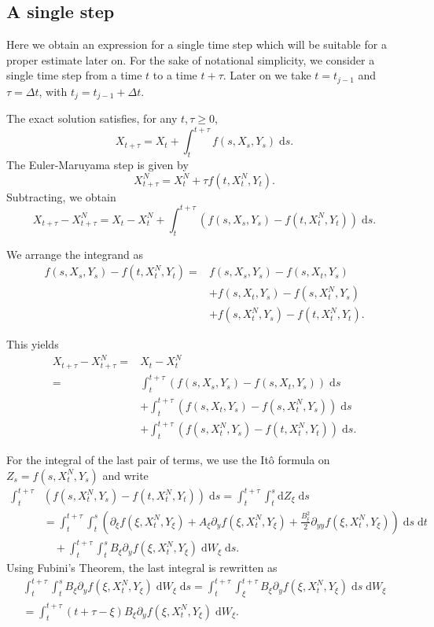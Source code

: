 \documentclass[reqno,12pt]{amsart}
\theoremstyle{plain}%
\theoremstyle{definition}
\begin{document}
\subsection{A single step}

Here we obtain an expression for a single time step which will be suitable for a proper estimate later on. For the sake of notational simplicity, we consider a single time step from a time $t$ to a time $t + \tau$. Later on we take $t=t_{j-1}$ and $\tau = \Delta t$, with $t_j = t_{j-1}+\Delta t$.

The exact solution satisfies, for any $t, \tau \geq 0$, 
$$
X_{t + \tau} = X_t + \int_t^{t + \tau} f(s, X_s, Y_s) \;\mathrm{d}s.
$$
The Euler-Maruyama step is given by
$$
X_{t+\tau}^N = X_t^N + \tau f(t, X_t^N, Y_t).
$$
Subtracting, we obtain
$$
X_{t + \tau} - X_{t + \tau}^N = X_t - X_t^N + \int_t^{t + \tau} \left( f(s, X_s, Y_s) - f(t, X_t^N, Y_t) \right)\;\mathrm{d}s.
$$

We arrange the integrand as
\begin{align*}
f(s, X_s, Y_s) - f(t, X_t^N, Y_t) = & f(s, X_s, Y_s) - f(s, X_t, Y_s) \\ 
 & + f(s, X_t, Y_s) - f(s, X_t^N, Y_s) \\
 & + f(s, X_t^N, Y_s) - f(t, X_t^N, Y_t).
\end{align*}

This yields
\begin{align*}
X_{t + \tau} - X_{t + \tau}^N  = & X_t - X_t^N \\
= &  \int_t^{t + \tau} \left( f(s, X_s, Y_s) - f(s, X_t, Y_s) \right)\;\mathrm{d}s \\ 
 & + \int_t^{t + \tau} \left( f(s, X_t, Y_s) - f(s, X_t^N, Y_s) \right)\;\mathrm{d}s \\
 & + \int_t^{t + \tau} \left( f(s, X_t^N, Y_s) - f(t, X_t^N, Y_t) \right)\;\mathrm{d}s.
\end{align*}

For the integral of the last pair of terms, we use the It\^o formula on $Z_s = f(s, X_t^N, Y_s)$ and write
\begin{align*}
\int_t^{t + \tau} & \left(f(s, X_t^N, Y_s) - f(t, X_t^N, Y_t) \right)\;\mathrm{d}s  = \int_t^{t + \tau} \int_t^s \mathrm{d}Z_\xi \;\mathrm{d}s \\
& = \int_t^{t + \tau} \int_t^s \left(\partial_\xi f(\xi, X_t^N, Y_\xi) + A_\xi \partial_y f(\xi, X_t^N, Y_\xi)  + \frac{B_\xi^2}{2}\partial_{yy}f(\xi, X_t^N, Y_\xi) \right) \;\mathrm{d}s\;\mathrm{d}t \\ 
& \quad + \int_t^{t + \tau} \int_t^s B_\xi \partial_y f(\xi, X_t^N, Y_\xi)\;\mathrm{d}W_\xi\;\mathrm{d}s.
\end{align*}
Using Fubini's Theorem, the last integral is rewritten as
\begin{multline}
\label{fubini}
\int_t^{t + \tau} \int_t^s B_\xi \partial_y f(\xi, X_t^N, Y_\xi)\;\mathrm{d}W_\xi\;\mathrm{d}s 
  = \int_t^{t + \tau} \int_\xi^{t + \tau} B_\xi \partial_y f(\xi, X_t^N, Y_\xi) \;\mathrm{d}s \;\mathrm{d}W_\xi \\
  = \int_t^{t+\tau} (t + \tau - \xi) B_\xi \partial_y f(\xi, X_t^N, Y_\xi) \;\mathrm{d}W_\xi.
\end{multline}
\end{document}
